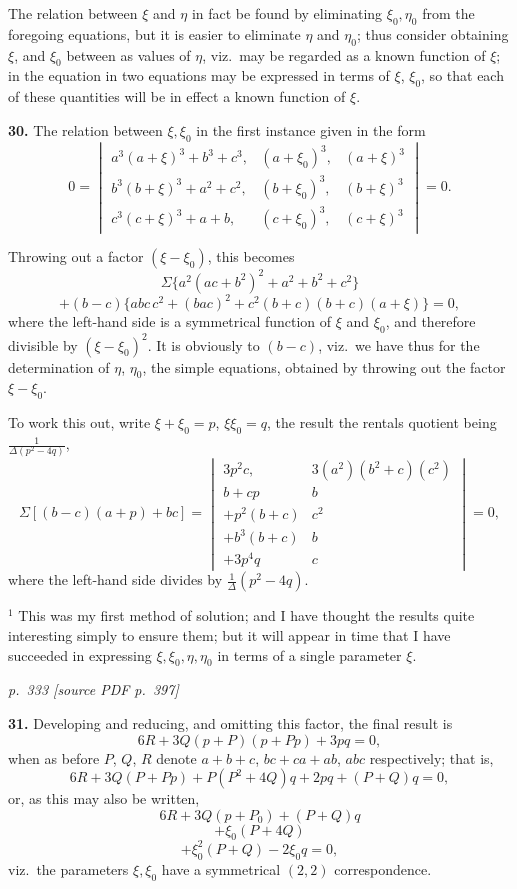 \documentclass[11pt,a4paper]{article}
\newcommand{\pagemarker}[2]{\par\bigskip\noindent\textit{p.~#1 [source PDF p.~#2]}\par\smallskip}
\begin{document}
The relation between $\xi$ and $\eta$ in fact be found by eliminating $\xi_0, \eta_0$ from the foregoing equations, but it is easier to eliminate $\eta$ and $\eta_0$; thus consider obtaining $\xi$, and $\xi_0$ between as values of $\eta$, viz.\ may be regarded as a known function of $\xi$; in the equation in two equations may be expressed in terms of $\xi$, $\xi_0$, so that each of these quantities will be in effect a known function of $\xi$.

\textbf{30.} The relation between $\xi, \xi_0$ in the first instance given in the form
\[
0 = \begin{vmatrix} a^3(a + \xi)^3 + b^3 + c^3, & (a + \xi_0)^3, & (a + \xi)^3 \\
b^3(b + \xi)^3 + a^2 + c^2, & (b + \xi_0)^3, & (b + \xi)^3 \\
c^3(c + \xi)^3 + a + b, & (c + \xi_0)^3, & (c + \xi)^3 \end{vmatrix} = 0.
\]

Throwing out a factor $(\xi - \xi_0)$, this becomes
\[
\Sigma\{a^2(a c + b^2)^2 + a^2 + b^2 + c^2\}
\]
\[
+ (b - c)\{abc \, c^2 + (b a c)^2 + c^2(b + c)(b + c)(a + \xi)\} = 0,
\]
where the left-hand side is a symmetrical function of $\xi$ and $\xi_0$, and therefore divisible by $(\xi - \xi_0)^2$. It is obviously to $(b - c)$, viz.\ we have thus for the determination of $\eta$, $\eta_0$, the simple equations, obtained by throwing out the factor $\xi - \xi_0$.

To work this out, write $\xi + \xi_0 = p$, $\xi\xi_0 = q$, the result the rentals quotient being $\frac{1}{\Delta(p^2 - 4q)}$,
\[
\Sigma[(b - c)(a + p) + bc] = \begin{vmatrix} 3p^2 c, & 3 (a^2)(b^2 + c)(c^2)\\
b + cp & b\\
+ p^2(b + c) & c^2\\
+ b^3(b + c) & b\\
+ 3p^4 q & c \end{vmatrix} = 0,
\]
where the left-hand side divides by $\tfrac{1}{\Delta}(p^2 - 4q)$.

\footnotesize
$^1$ This was my first method of solution; and I have thought the results quite interesting simply to ensure them; but it will appear in time that I have succeeded in expressing $\xi, \xi_0, \eta, \eta_0$ in terms of a single parameter $\xi$.

\clearpage

\pagemarker{333}{397}

\textbf{31.} Developing and reducing, and omitting this factor, the final result is
\[
6R + 3Q(p + P)(p + Pp) + 3pq = 0,
\]
when as before $P$, $Q$, $R$ denote $a + b + c$, $bc + ca + ab$, $abc$ respectively; that is,
\[
6R + 3Q(P + Pp) + P(P^2 + 4Q)q + 2pq + (P + Q)q = 0,
\]
or, as this may also be written,
\[
6R + 3Q(p + P_0) + (P + Q)q
\]
\[
+ \xi_0 (P + 4Q)
\]
\[
+ \xi_0^2 (P + Q) - 2\xi_0 q = 0,
\]
viz.\ the parameters $\xi, \xi_0$ have a symmetrical $(2, 2)$ correspondence.
\end{document}
